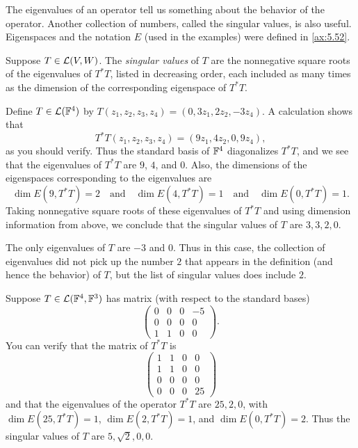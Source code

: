 The eigenvalues of an operator tell us something about the behavior of the
operator. Another collection of numbers, called the singular values, is also
useful. Eigenspaces and the notation $E$ (used in the examples) were defined in
\ref{ax:5.52}.

\begin{definition}\label{ax:7.65}
Suppose $T\in\mathcal{L}(V,W)$. The \emph{singular values} of $T$ are the nonnegative
square roots of the eigenvalues of $T^*T$, listed in decreasing order, each
included as many times as the dimension of the corresponding eigenspace of
$T^*T$.
\end{definition}

\begin{example}\label{ax:7.66}
Define $T\in\mathcal{L}(\mathbb{F}^4)$ by $T(z_1,z_2,z_3,z_4)=\allowbreak(0,3z_1,2z_2,-3z_4)$. A
calculation shows that
\[ T^*T(z_1,z_2,z_3,z_4) = (9z_1,4z_2,0,9z_4), \]
as you should verify. Thus the standard basis of $\mathbb{F}^4$ diagonalizes $T^*T$,
and we see that the eigenvalues of $T^*T$ are $9$, $4$, and $0$. Also, the
dimensions of the eigenspaces corresponding to the eigenvalues are
\[ \dim E(9,T^*T)=2 \quad\text{and}\quad \dim E(4,T^*T)=1 \quad\text{and}\quad
   \dim E(0,T^*T)=1. \]
Taking nonnegative square roots of these eigenvalues of $T^*T$ and using
dimension information from above, we conclude that the singular values of $T$
are $3,3,2,0$.

The only eigenvalues of $T$ are $-3$ and $0$. Thus in this case, the collection
of eigenvalues did not pick up the number $2$ that appears in the definition
(and hence the behavior) of $T$, but the list of singular values does include
$2$.
\end{example}

\begin{example}\label{ax:7.67}
Suppose $T\in\mathcal{L}(\mathbb{F}^4,\mathbb{F}^3)$ has matrix (with respect to the standard bases)
\[ \begin{pmatrix} 0&0&0&-5\\ 0&0&0&0\\ 1&1&0&0 \end{pmatrix}. \]
You can verify that the matrix of $T^*T$ is
\[ \begin{pmatrix} 1&1&0&0\\ 1&1&0&0\\ 0&0&0&0\\ 0&0&0&25 \end{pmatrix} \]
and that the eigenvalues of the operator $T^*T$ are $25,2,0$, with
$\dim E(25,T^*T)=1$, $\dim E(2,T^*T)=1$, and $\dim E(0,T^*T)=2$. Thus the
singular values of $T$ are $5,\sqrt2,0,0$.
\end{example}

